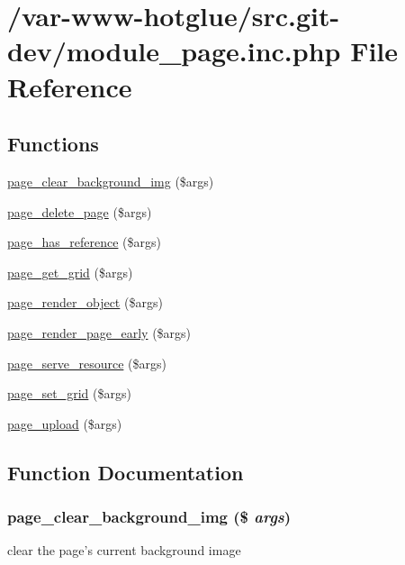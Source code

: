 \hypertarget{module__page_8inc_8php}{
\section{/var-\/www-\/hotglue/src.git-\/dev/module\_\-page.inc.php File Reference}
\label{module__page_8inc_8php}
}
\subsection*{Functions}
\begin{DoxyCompactItemize}
\item 
\hyperlink{module__page_8inc_8php_a6bef3e7d1d82b4117ed83e4c72b5d652}{page\_\-clear\_\-background\_\-img} (\$args)
\item 
\hyperlink{module__page_8inc_8php_aedf11987fbd07763073255783077951b}{page\_\-delete\_\-page} (\$args)
\item 
\hyperlink{module__page_8inc_8php_a0184f1023facb8121f9a99348c978d55}{page\_\-has\_\-reference} (\$args)
\item 
\hyperlink{module__page_8inc_8php_aac90d98ff7e17055e3dc3d953371d673}{page\_\-get\_\-grid} (\$args)
\item 
\hyperlink{module__page_8inc_8php_a53e7091b9a654d0d772cea6e3127820e}{page\_\-render\_\-object} (\$args)
\item 
\hyperlink{module__page_8inc_8php_a80aff2ea069c7a2ba120e26bb218efa5}{page\_\-render\_\-page\_\-early} (\$args)
\item 
\hyperlink{module__page_8inc_8php_a4072227b7cf50c8d7bb6f49d85d95c39}{page\_\-serve\_\-resource} (\$args)
\item 
\hyperlink{module__page_8inc_8php_aaadab51471c838ab9a0fa0c93a04b817}{page\_\-set\_\-grid} (\$args)
\item 
\hyperlink{module__page_8inc_8php_a0b7e8997d0fe2f4725a68e158f2d0fb5}{page\_\-upload} (\$args)
\end{DoxyCompactItemize}


\subsection{Function Documentation}
\hypertarget{module__page_8inc_8php_a6bef3e7d1d82b4117ed83e4c72b5d652}{
\subsubsection[{page\_\-clear\_\-background\_\-img}]{\setlength{\rightskip}{0pt plus 5cm}page\_\-clear\_\-background\_\-img (\$ {\em args})}}
\label{module__page_8inc_8php_a6bef3e7d1d82b4117ed83e4c72b5d652}
clear the page's current background image



